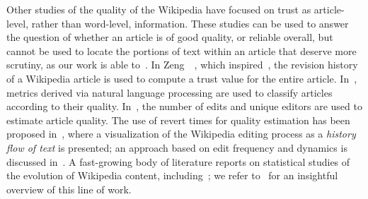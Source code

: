 Other studies of the quality of the Wikipedia have focused on trust as
article-level, rather than word-level, information.
These studies can be used to answer the question of whether an
article is of good quality, or reliable overall, but cannot be used to
locate the portions of text within an article that deserve more
scrutiny, as our work is able to~\cite{Adler2008}.
In Zeng~\etal~\cite{Zeng2006}, which inspired~\cite{McGuinness06}, the
revision history of a Wikipedia article is used to compute a trust
value for the entire article.
In~\cite{Emigh05b,Mingus07}, metrics derived via natural language processing
are used to classify articles according to their quality.
In~\cite{Lih2004}, the number of edits and unique editors are used to
estimate article quality.
The use of revert times for quality estimation has been proposed
in~\cite{Viegas2004}, where a visualization of the Wikipedia editing
process as a \textit{history flow of text}
is presented; an approach based on edit frequency and dynamics
is discussed in~\cite{Wilkinson2007}.
A fast-growing body of literature reports on
statistical studies of the evolution of Wikipedia content,
including~\cite{Viegas2004,Voss2005,Ortega2007}; we refer to~\cite{Ortega2007} for an
insightful overview of this line of work.


